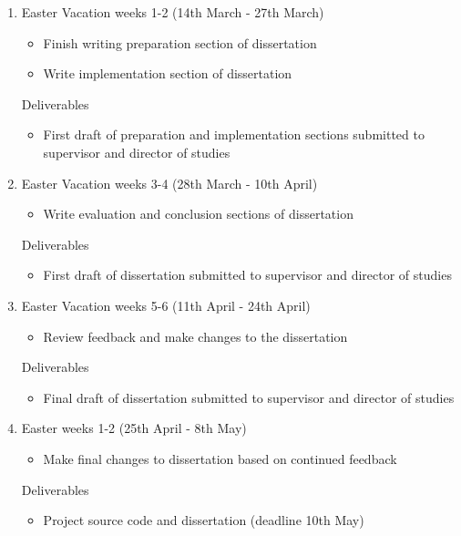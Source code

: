 \documentclass[12pt,a4paper]{article}
\begin{document}
\begin{enumerate}
    \item Easter Vacation weeks 1-2 (14th March - 27th March)
    \begin{itemize}
        \item Finish writing preparation section of dissertation
        \item Write implementation section of dissertation
    \end{itemize}
    Deliverables
    \begin{itemize}
        \item First draft of preparation and implementation sections submitted to supervisor and director of studies
    \end{itemize}

    \item Easter Vacation weeks 3-4 (28th March - 10th April)
    \begin{itemize}
        \item Write evaluation and conclusion sections of dissertation
    \end{itemize}
    Deliverables
    \begin{itemize}
        \item First draft of dissertation submitted to supervisor and director of studies
    \end{itemize}

    \item Easter Vacation weeks 5-6 (11th April - 24th April)
    \begin{itemize}
        \item Review feedback and make changes to the dissertation 
    \end{itemize}
    Deliverables
    \begin{itemize}
        \item Final draft of dissertation submitted to supervisor and director of studies
    \end{itemize}

    \item Easter weeks 1-2 (25th April - 8th May)
    \begin{itemize}
        \item Make final changes to dissertation based on continued feedback
    \end{itemize}
    Deliverables
    \begin{itemize}
        \item Project source code and dissertation (deadline 10th May)
    \end{itemize}

\end{enumerate}
\end{document}
